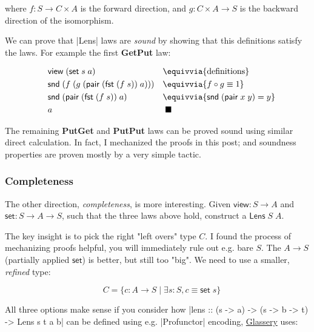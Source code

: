 \documentclass{article}
\begin{document}
where $f : S \to C \times A$ is the forward direction, and $g : C \times A \to S $ is the backward direction of the isomorphism.

We can prove that |Lens| laws are \emph{sound} by showing that this definitions satisfy the laws.
For example the first \textbf{GetPut} law:

\begin{equation}
\begin{aligned}
  \quad &\mathsf{view}\; (\mathsf{set}\; s\; a)                             &&\equivvia{ \text{definitions} } \\
      &\mathsf{snd}\;(f\; (g\; (\mathsf{pair}\;(\mathsf{fst}\;(f\;s))\;a))) &&\equivvia{ f \circ g \equiv 1 } \\
      &\mathsf{snd}\;(\mathsf{pair}\;(\mathsf{fst}\;(f\;s))\;a)             &&\equivvia{ \mathsf{snd}\;(\mathsf{pair}\;x\;y) = y } \\
      &a                                                                    &&\;\blacksquare
\end{aligned}
\end{equation}

The remaining \textbf{PutGet} and \textbf{PutPut} laws can be proved sound
using similar direct calculation. In fact, I mechanized the proofs in this post;
and soundness properties are proven mostly by a very simple tactic.

\subsubsection{Completeness}

The other direction, \emph{completeness}, is more interesting.
Given $\mathsf{view} : S \to A$ and $\mathsf{set} : S \to A \to S$, such that
the three laws above hold, construct a $\mathsf{Lens}\;S\;A$.

The key insight is to pick the right "left overs" type $C$.
I found the process of mechanizing proofs helpful, you will immediately rule out e.g. bare $S$.
The $A \to S$ (partially applied $\mathsf{set}$) is better, but still too "big".
We need to use a smaller, \emph{refined} type:

\begin{equation}
\quad C = \{ c : A \to S \mid \exists s : S, c \equiv \mathsf{set}\; s \}
\end{equation}

All three options make sense if you consider how |lens :: (s -> a) -> (s -> b -> t) -> Lens s t a b| can be defined using e.g. |Profunctor| encoding,
\href{2017-04-18-glassery.html#v:lens}{Glassery} uses:
\end{document}
